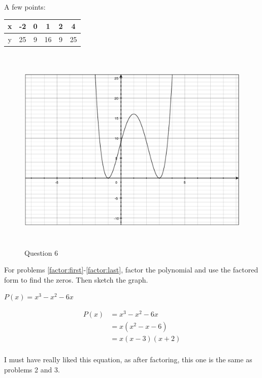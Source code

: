 \documentclass[fleqn,addpoints]{exam}
\begin{document}
\begin{questions}
\begin{solution}
A few points:
\begin{tabular}{|c|c|c|c|c|c|}
\hline
  x & -2  & 0 &  1 & 2 & 4 \\
\hline
  y & 25  & 9 & 16 & 9 & 25 \\
\hline
\end{tabular}

\begin{figure}[H]
  \centering
  \includegraphics[width=14cm,height=10cm]{question_6.eps}
  \caption*{Question 6}
\end{figure}

\end{solution}
 
For problems \ref{factor:first}-\ref{factor:last}, factor the polynomial and use the factored form to find the zeros.
Then sketch the graph.

\question  $P(x) = x^3 - x^2 - 6x$
\label{factor:first}
\begin{solution}

\begin{align*}
  P(x) &= x^3 - x^2 - 6x \\
       &= x(x^2 - x - 6) \\
       &= x(x-3)(x+2) \\
\end{align*}

I must have really liked this equation, as after factoring, this one is the same as problems 2 and 3.

\end{solution}

\ifprintanswers
\pagebreak
\else
\fi


\end{questions}
\end{document}
